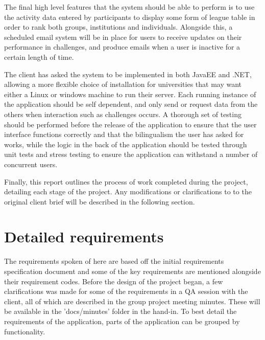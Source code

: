 The final high level features that the system should be able to perform is to use the activity data entered by participants to display some form of league table in order to rank both groups, institutions and individuals. Alongside this, a scheduled email system will be in place for users to receive updates on their performance in challenges, and produce emails when a user is inactive for a certain length of time.\par
The client has asked the system to be implemented in both JavaEE and .NET, allowing a more flexible choice of installation for universities that may want either a Linux or windows machine to run their server. Each running instance of the application should be self dependent, and only send or request data from the others when interaction such as challenges occurs. A thorough set of testing should be performed before the release of the application to ensure that the user interface functions correctly and that the bilingualism the user has asked for works, while the logic in the back of the application should be tested through unit tests and stress testing to ensure the application can withstand a number of concurrent users.\par
Finally, this report outlines the process of work completed during the project, detailing each stage of the project. Any modifications or clarifications to to the original client brief will be described in the following section.

\section{Detailed requirements}
The requirements spoken of here are based off the initial requirements specification document \cite{initialReq} and some of the key requirements are mentioned alongside their requirement codes. Before the design of the project began, a few clarifications was made for some of the requirements in a QA session with the client, all of which are described in the group project meeting minutes. These will be available in the 'docs/minutes' folder in the hand-in. To best detail the requirements of the application, parts of the application can be grouped by functionality. \par
